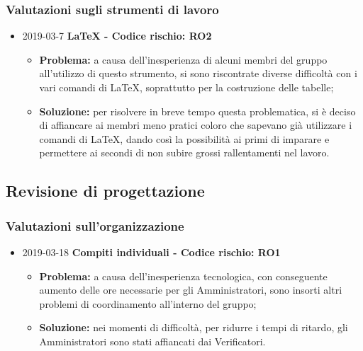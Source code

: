 \subsubsection{Valutazioni sugli strumenti di lavoro}
\begin{itemize}
				
		\item 2019-03-7 \textbf{\LaTeX{} - Codice rischio: RO2} \\
		\begin{itemize}
			\item \textbf{Problema:} a causa dell'inesperienza di alcuni membri del gruppo all'utilizzo di questo strumento, si sono riscontrate diverse difficoltà con i vari comandi di \LaTeX{}, soprattutto per la costruzione delle tabelle;
			\item \textbf{Soluzione:} per risolvere in breve tempo questa problematica, si è deciso di affiancare
		ai membri meno pratici coloro che sapevano già utilizzare i comandi di \LaTeX{}, dando
		così la possibilità ai primi di imparare e permettere ai secondi di non 
		subire grossi rallentamenti nel lavoro.
		\end{itemize}		
		
\end{itemize}

\subsection{Revisione di progettazione}

\subsubsection{Valutazioni sull'organizzazione}
\begin{itemize}	
		\item 2019-03-18 \textbf{Compiti individuali - Codice rischio: RO1} \\
		\begin{itemize}
			\item \textbf{Problema:} a causa dell'inesperienza tecnologica, con conseguente aumento delle ore necessarie per gli Amministratori, sono insorti altri problemi di coordinamento all'interno del gruppo;
			\item \textbf{Soluzione:} nei momenti di difficoltà, per ridurre i tempi di ritardo, gli Amministratori sono stati affiancati dai Verificatori.
		\end{itemize}
	
\end{itemize}


